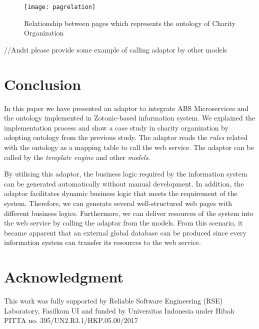 \documentclass[conference]{IEEEtran}
\begin{document}
\begin{figure}[h]
	\centering
	\texttt{[image: pagrelation]}
	
	\caption{Relationship between pages which represents the ontology of Charity Organization}
	\label{view_program}
\end{figure}


//Andri please provide some example of calling adaptor by other models

\section{Conclusion} \label{conclusion}
In this paper we have presented an adaptor to integrate ABS Microservices and the ontology implemented in Zotonic-based information system. We explained the implementation process and show a case study in charity organization by adopting ontology from the previous study. The adaptor reads the \textit{rules} related with the ontology as a mapping table to call the web service. The adaptor can be called by the \textit{template engine} and other \textit{models}.

By utilising this adaptor, the business logic required by the information system can be generated automatically without manual development. In addition, the adaptor facilitates dynamic business logic that meets the requirement of the system. Therefore, we can generate several well-structured web pages with different business logics. Furthermore, we can deliver resources of the system into the web service by calling the adaptor from the models. From this scenario, it became apparent that an external global database can be produced since every information system can transfer its resources to the web service. 

\section*{Acknowledgment}
This work was fully supported by Reliable Software Engineering (RSE) Laboratory, Fasilkom UI and funded by Universitas Indonesia under Hibah PITTA no. 395/UN2.R3.1/HKP.05.00/2017



\end{document}
